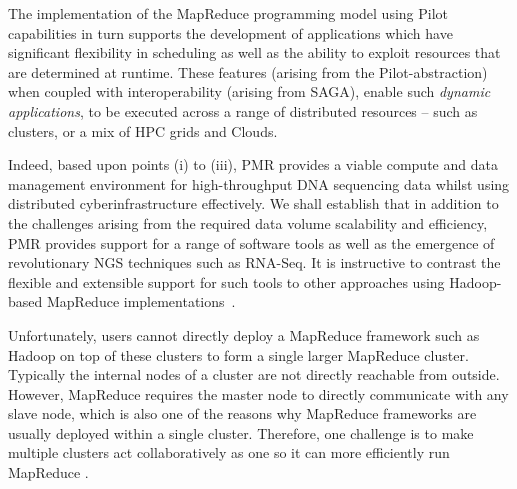 \documentclass{acm_proc_article-sp}
\begin{document}



The implementation of the MapReduce programming model using Pilot
capabilities in turn supports the development of applications which
have significant flexibility in scheduling as well as the ability to
exploit resources that are determined at runtime.  These features
(arising from the Pilot-abstraction) when coupled with
interoperability (arising from SAGA), enable such {\it dynamic
  applications}, to be executed across a range of distributed
resources -- such as clusters, or a mix of HPC grids and Clouds.

Indeed, based upon points (i) to (iii), PMR provides a viable compute
and data management environment for high-throughput DNA sequencing
data whilst using distributed cyberinfrastructure
effectively.  %
We shall establish that in addition to the challenges arising from the
required data volume scalability and efficiency, PMR provides support
for a range of software tools as well as the emergence of
revolutionary NGS techniques such as RNA-Seq.  It is instructive to
contrast the flexible and extensible support for such tools to other
approaches using Hadoop-based MapReduce
implementations~\cite{cloudburst,langmead2009,seal2011,langmead2010}.






Unfortunately, users cannot directly deploy a MapReduce framework such
as Hadoop on top of these clusters to form a single larger MapReduce
cluster. Typically the internal nodes of a cluster are not directly
reachable from outside. However, MapReduce requires the master node to
directly communicate with any slave node, which is also one of the
reasons why MapReduce frameworks are usually deployed within a single
cluster. Therefore, one challenge is to make multiple clusters act
collaboratively as one so it can more efficiently run MapReduce \cite{ecmls11-mr-autodock}.
 
\end{document}
